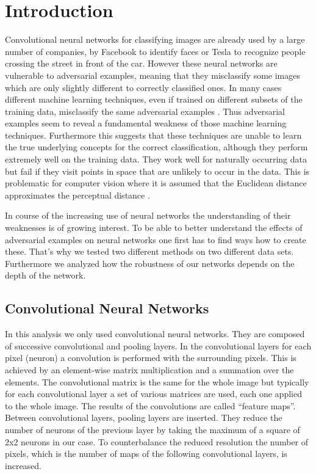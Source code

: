 \documentclass[%
 reprint,
 amsmath,amssymb,
 aps,
]{revtex4-1}
\begin{document}

\section{Introduction}

Convolutional neural networks for classifying images are already used by a large number of companies, by Facebook to identify faces or Tesla to recognize people crossing the street in front of the car. 
However these neural networks are vulnerable to adversarial examples, meaning that they misclassify some images which are only slightly different to correctly classified ones. In many cases different machine learning techniques, even if trained on different subsets of the training data, misclassify the same adversarial examples \cite{paperGrad}. Thus adversarial examples seem to reveal a fundamental weakness of those machine learning techniques. Furthermore this suggests that these techniques are unable to learn the true underlying concepts for the correct classification, although they perform extremely well on the training data. They work well for naturally occurring data but fail if they visit points in space that are unlikely to occur in the data. This is problematic for computer vision where it is assumed that the Euclidean distance approximates the perceptual distance \cite{paperGrad}.

In course of the increasing use of neural networks the understanding of their weaknesses is of growing interest. To be able to better understand the effects of adversarial examples on neural networks one first has to find ways how to create these. That's why we tested two different methods on two different data sets. Furthermore we analyzed how the robustness of our networks depends on the depth of the network.

\subsection{Convolutional Neural Networks}


In this analysis we only used convolutional neural networks. They are composed of successive convolutional and pooling layers. In the convolutional layers for each pixel (neuron) a convolution is performed with the surrounding pixels. This is achieved by an element-wise matrix multiplication and a summation over the elements. The convolutional matrix is the same for the whole image but typically for each convolutional layer a set of various matrices are used, each one applied to the whole image. The results of the convolutions are called ``feature maps''. Between convolutional layers, pooling layers are inserted. They reduce the number of neurons of the previous layer by taking the maximum of a square of 2x2 neurons in our case. To counterbalance the reduced resolution the number of pixels, which is the number of maps of the following convolutional layers, is increased.
\end{document}
